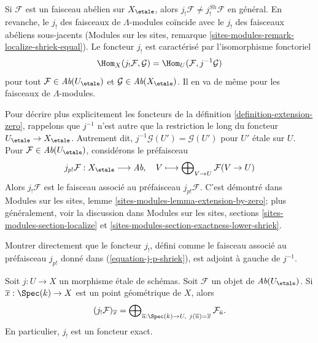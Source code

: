 \noindent
Si $\mathcal{F}$ est un faisceau abélien sur $X_\etale$, alors
$j_!\mathcal{F} \not = j_!^{Sh}\mathcal{F}$ en général. En revanche,
le $j_!$ des faisceaux de $\Lambda$-modules coïncide avec le $j_!$ des
faisceaux abéliens sous-jacents
(Modules sur les sites, remarque \ref{sites-modules-remark-localize-shriek-equal}).
Le foncteur $j_!$ est caractérisé par l'isomorphisme fonctoriel
$$
\Hom_X(j_!\mathcal{F}, \mathcal{G}) = \Hom_U(\mathcal{F}, j^{-1}\mathcal{G})
$$
pour tout $\mathcal{F} \in \textit{Ab}(U_\etale)$ et
$\mathcal{G} \in \textit{Ab}(X_\etale)$. Il en va de même pour les
faisceaux de $\Lambda$-modules.

\medskip\noindent
Pour décrire plus explicitement les foncteurs de la définition \ref{definition-extension-zero},
rappelons que $j^{-1}$ n'est autre que la restriction
le long du foncteur $U_\etale \to X_\etale$. Autrement dit,
$j^{-1}\mathcal{G}(U') = \mathcal{G}(U')$ pour $U'$ étale sur $U$.
Pour $\mathcal{F} \in \textit{Ab}(U_\etale)$, considérons le
préfaisceau
\begin{equation}
\label{equation-j-p-shriek}
j_{p!}\mathcal{F} : X_\etale \longrightarrow \textit{Ab},
\quad
V \longmapsto \bigoplus\nolimits_{V \to U} \mathcal{F}(V \to U)
\end{equation}
Alors $j_!\mathcal{F}$ est le faisceau associé au préfaisceau $j_{p!}\mathcal{F}$.
C'est démontré dans Modules sur les sites, lemme
\ref{sites-modules-lemma-extension-by-zero};
plus généralement, voir la discussion dans
Modules sur les sites, sections \ref{sites-modules-section-localize} et
\ref{sites-modules-section-exactness-lower-shriek}.

\begin{exercise}
\label{exercise-jshriek-direct}
Montrer directement que le foncteur $j_!$, défini comme le faisceau associé au
préfaisceau $j_{p!}$ donné dans
(\ref{equation-j-p-shriek}), est adjoint à gauche de $j^{-1}$.
\end{exercise}

\begin{proposition}
\label{proposition-describe-jshriek}
Soit $j : U \to X$ un morphisme étale de schémas.
Soit $\mathcal{F}$ un objet de $\textit{Ab}(U_\etale)$.
Si $\overline{x} : \Spec(k) \to X$ est un point géométrique de $X$, alors
$$
(j_!\mathcal{F})_{\overline{x}} =
\bigoplus\nolimits_{\overline{u} : \Spec(k) \to U,\ j(\overline{u}) =
\overline{x}} \mathcal{F}_{\bar{u}}.
$$
En particulier, $j_!$ est un foncteur exact.
\end{proposition}

